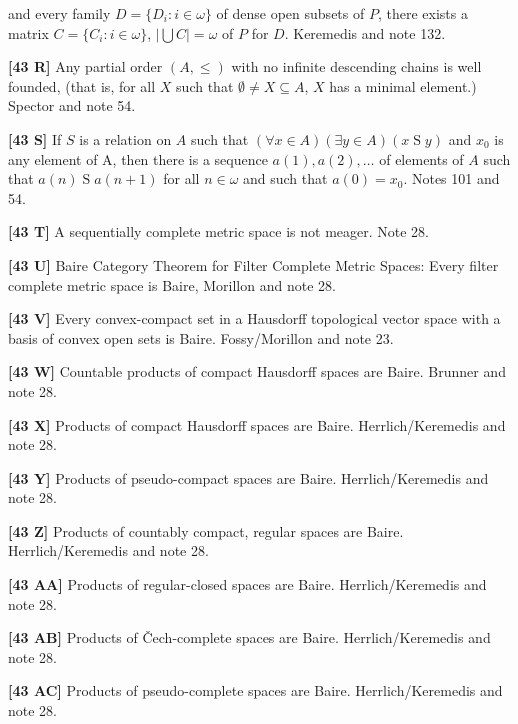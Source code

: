 and every family $D=\{D_i: i\in\omega\}$ of dense open subsets of $P$,
there exists a matrix $C=\{C_i: i\in\omega\}$, $|\bigcup C|=\omega$ of $P$
for $D$.  \ac{Keremedis} \cite{1996b} and note 132.
\smallskip
\item{}{\bf [43 R]}  Any partial order $(A,\le)$ with no infinite
descending chains is well founded, (that is, for all $X$ such that
$\emptyset\neq X\subseteq A$, $X$ has a minimal element.)
\ac{Spector} \cite{1980} and note 54.
\smallskip
\item{}{\bf [43 S]}  If $S$ is a relation on $A$ such that
$(\forall x \in A)( \exists y \in A)(x \mathrel S y)$ and $x_0$ is any
element of A, then there is a sequence $a(1),a(2),\ldots $ of
elements of $A$ such that $a(n) \mathrel S a(n+1)$ for all
$n \in  \omega $ and such that $a(0) = x_0$. Notes 101 and 54.
\smallskip
\item{}{\bf [43 T]} A sequentially complete metric space is not meager.
Note 28.
\smallskip
\item{}{\bf [43 U]} Baire Category Theorem for Filter Complete Metric
Spaces:  Every filter complete metric space is Baire, \ac{Morillon}
\cite{1988} and note 28.
\smallskip
\item{}{\bf [43 V]}  Every convex-compact set in a Hausdorff topological
vector space with a basis of convex open sets is Baire.
\ac{Fossy/Morillon} \cite{1998} and note 23.
\smallskip
\item{}{\bf [43 W]} Countable products of compact Hausdorff spaces are
Baire.  \ac{Brunner} \cite{1983c} and note 28.
\smallskip
\item{}{\bf [43 X]} Products of compact Hausdorff spaces are Baire.
\ac{Herrlich/Keremedis} \cite{1999} and note 28.
\smallskip
\item{}{\bf [43 Y]} Products of pseudo-compact spaces are Baire.
\ac{Herrlich/Keremedis} \cite{1999} and note 28.
\smallskip
\item{}{\bf [43 Z]} Products of countably compact, regular spaces are
Baire.  \ac{Herrlich/Keremedis} \cite{1999} and note 28.
\smallskip
\item{}{\bf [43 AA]} Products of regular-closed spaces are Baire.
\ac{Herrlich/Keremedis} \cite{1999} and note 28.
\smallskip
\item{}{\bf [43 AB]} Products of \v Cech-complete spaces are Baire.
\ac{Herrlich/Keremedis} \cite{1999} and note 28.
\smallskip
\item{}{\bf [43 AC]} Products of pseudo-complete spaces are Baire.
\ac{Herrlich/Keremedis} \cite{1999} and note 28.
\smallskip
